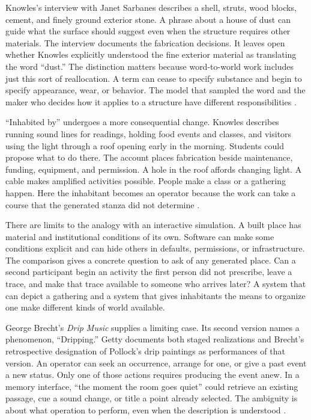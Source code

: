 \documentclass[11pt,letterpaper]{article}
\newcommand{\work}[1]{\textit{#1}}
\begin{document}
Knowles’s interview with Janet Sarbanes describes a shell, struts, wood blocks, cement, and finely ground exterior stone. A phrase about a house of dust can guide what the surface should suggest even when the structure requires other materials. The interview documents the fabrication decisions. It leaves open whether Knowles explicitly understood the fine exterior material as translating the word “dust.” The distinction matters because word-to-world work includes just this sort of reallocation. A term can cease to specify substance and begin to specify appearance, wear, or behavior. The model that sampled the word and the maker who decides how it applies to a structure have different responsibilities \citep{KnowlesSarbanes}.

“Inhabited by” undergoes a more consequential change. Knowles describes running sound lines for readings, holding food events and classes, and visitors using the light through a roof opening early in the morning. Students could propose what to do there. The account places fabrication beside maintenance, funding, equipment, and permission. A hole in the roof affords changing light. A cable makes amplified activities possible. People make a class or a gathering happen. Here the inhabitant becomes an operator because the work can take a course that the generated stanza did not determine \citep{KnowlesSarbanes,Taylor2009}.

There are limits to the analogy with an interactive simulation. A built place has material and institutional conditions of its own. Software can make some conditions explicit and can hide others in defaults, permissions, or infrastructure. The comparison gives a concrete question to ask of any generated place. Can a second participant begin an activity the first person did not prescribe, leave a trace, and make that trace available to someone who arrives later? A system that can depict a gathering and a system that gives inhabitants the means to organize one make different kinds of world available.

George Brecht’s \work{Drip Music} supplies a limiting case. Its second version names a phenomenon, “Dripping.” Getty documents both staged realizations and Brecht’s retrospective designation of Pollock’s drip paintings as performances of that version. An operator can seek an occurrence, arrange for one, or give a past event a new status. Only one of those actions requires producing the event anew. In a memory interface, “the moment the room goes quiet” could retrieve an existing passage, cue a sound change, or title a point already selected. The ambiguity is about what operation to perform, even when the description is understood \citep{Brecht1959}.
\end{document}

